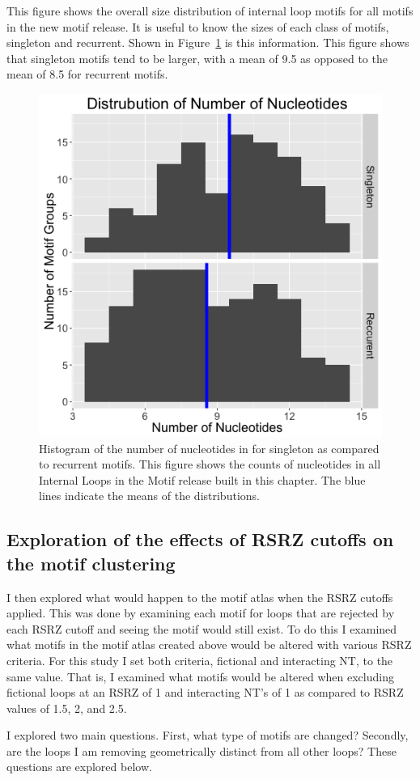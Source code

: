 This figure shows the overall size distribution of internal loop motifs for all
motifs in the new motif release. It is useful to know the sizes of each class of
motifs, singleton and recurrent. Shown in Figure~\ref{fig:num-nt-by-class} is this
information. This figure shows that singleton motifs tend to be larger, with a
mean of 9.5 as opposed to the mean of 8.5 for recurrent motifs.

\begin{figure}
  \includegraphics[width=0.5\linewidth]{chapter-5/figs/motifs/nucleotides-by-class}
  \caption{Histogram of the number of nucleotides in for singleton as compared
  to recurrent motifs. This figure shows the counts of nucleotides in all
  Internal Loops in the Motif release built in this chapter. The blue lines
  indicate the means of the distributions.}
  \label{fig:num-nt-by-class}
\end{figure}

\subsection{Exploration of the effects of RSRZ cutoffs on the motif clustering}

I then explored what would happen to the motif atlas when the RSRZ cutoffs
applied. This was done by examining each motif for loops that are rejected by
each RSRZ cutoff and seeing the motif would still exist. To do this I examined
what motifs in the motif atlas created above would be altered with various RSRZ
criteria. For this study I set both criteria, fictional and interacting NT, to
the same value. That is, I examined what motifs would be altered when excluding
fictional loops at an RSRZ of 1 and interacting NT's of 1 as compared to RSRZ
values of 1.5, 2, and 2.5.

I explored two main questions. First, what type of motifs are changed? Secondly,
are the loops I am removing geometrically distinct from all other loops? These
questions are explored below.

